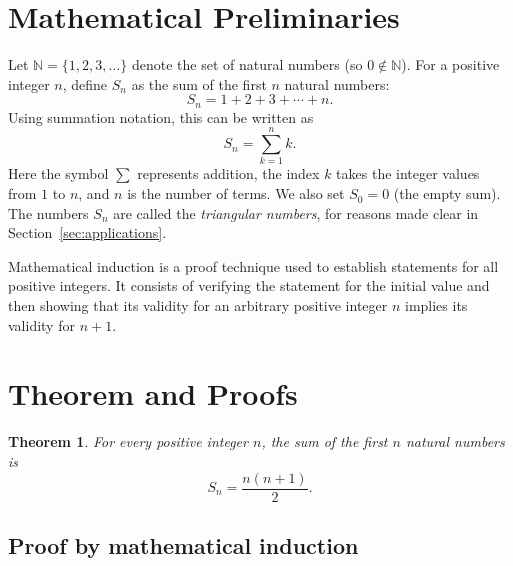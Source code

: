 \documentclass[12pt,a4paper]{article}
\newtheorem{theorem}{Theorem}
\theoremstyle{definition}
\begin{document}
\section{Mathematical Preliminaries}
 
Let $\mathbb{N} = \{1,2,3,\ldots\}$ denote the set of natural numbers (so $0\notin\mathbb{N}$). For a positive integer $n$, define \(S_n\) as the sum of the first $n$ natural numbers:
\[ S_n = 1 + 2 + 3 + \cdots + n. \] %
Using summation notation, this can be written as
\[ S_n = \sum_{k = 1}^n k. \]
Here the symbol \(\sum\) represents addition, the index $k$ takes the integer values from $1$ to $n$, and $n$ is the number of terms. We also set $S_0=0$ (the empty sum). The numbers $S_n$ are called the \emph{triangular numbers}, for reasons made clear in Section~\ref{sec:applications}.
 
Mathematical induction is a proof technique used to establish statements for all positive integers. It consists of verifying the statement for the initial value and then showing that its validity for an arbitrary positive integer $n$ implies its validity for $n+1$.
 
\section{Theorem and Proofs}
 
\begin{theorem}\label{thm:sum}
    For every positive integer $n$, the sum of the first $n$ natural numbers is
    \begin{equation}\label{eq:sum}
        S_n = \frac{n(n+1)}{2}.
    \end{equation}
\end{theorem}
 
\subsection{Proof by mathematical induction}
 
\end{document}
